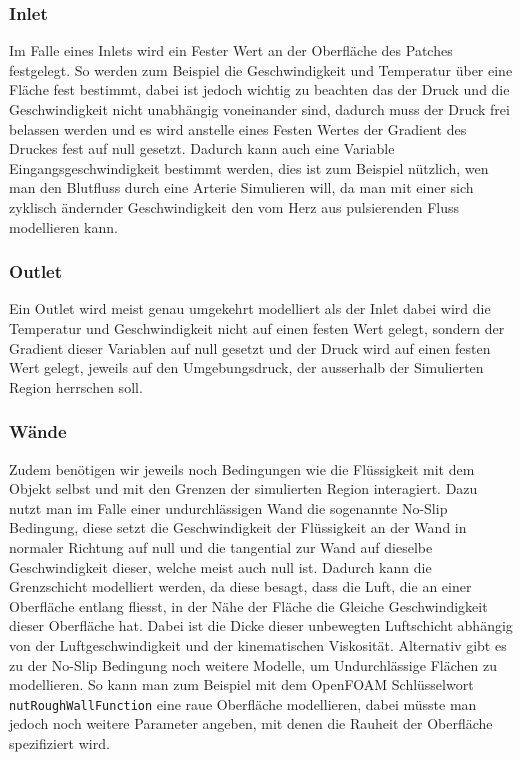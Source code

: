 \subsubsection{Inlet}
Im Falle eines Inlets wird ein Fester Wert an der Oberfläche des Patches festgelegt. So werden zum Beispiel die Geschwindigkeit und Temperatur über eine Fläche fest bestimmt, dabei ist jedoch wichtig zu beachten das der Druck und die Geschwindigkeit nicht unabhängig voneinander sind, dadurch muss der Druck frei belassen werden und es wird anstelle eines Festen Wertes der Gradient des Druckes fest auf null gesetzt. 
Dadurch kann auch eine Variable Eingangsgeschwindigkeit bestimmt werden, dies ist zum Beispiel nützlich, wen man den Blutfluss durch eine Arterie Simulieren will, da man mit einer sich zyklisch ändernder Geschwindigkeit den vom Herz aus pulsierenden Fluss modellieren kann.

\subsubsection{Outlet}
Ein Outlet wird meist genau umgekehrt modelliert als der Inlet dabei wird die Temperatur und Geschwindigkeit nicht auf einen festen Wert gelegt, sondern der Gradient dieser Variablen auf null gesetzt und der Druck wird auf einen festen Wert gelegt, jeweils auf den Umgebungsdruck, der ausserhalb der Simulierten Region herrschen soll.

\subsubsection{Wände}
Zudem benötigen wir jeweils noch Bedingungen wie die Flüssigkeit mit dem Objekt selbst und mit den Grenzen der simulierten Region interagiert.
Dazu nutzt man im Falle einer undurchlässigen Wand die sogenannte No-Slip Bedingung, diese setzt die Geschwindigkeit der Flüssigkeit an der Wand in normaler Richtung auf null und die tangential zur Wand auf dieselbe Geschwindigkeit dieser, welche meist auch null ist. 
Dadurch kann die Grenzschicht modelliert werden, da diese besagt, dass die Luft, die an einer Oberfläche entlang fliesst, in der Nähe der Fläche die Gleiche Geschwindigkeit dieser Oberfläche hat.
Dabei ist die Dicke dieser unbewegten Luftschicht abhängig von der Luftgeschwindigkeit und der kinematischen Viskosität.
Alternativ gibt es zu der No-Slip Bedingung noch weitere Modelle, um Undurchlässige Flächen zu modellieren.
So kann man zum Beispiel mit dem OpenFOAM Schlüsselwort \texttt{nutRoughWallFunction} eine raue Oberfläche modellieren, dabei müsste man jedoch noch weitere Parameter angeben, mit denen die Rauheit der Oberfläche spezifiziert wird.

